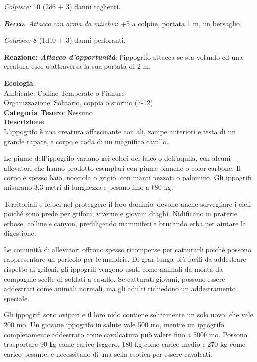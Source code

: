 \begin{multicols}{2}
{\emph{Colpisce:} 10 (2d6 + 3) danni taglienti.

\emph{\textbf{Becco.} Attacco con arma da mischia}: +5 a colpire, portata 1 m, un bersaglio.

\emph{Colpisce:} 8 (1d10 + 3) danni perforanti.

\textbf{Reazione: \emph{Attacco d'opportunità}}: l'ippogrifo attacca se sta volando ed una creatura esce o attraversa la sua portata di 2 m.

\textbf{Ecologia}\\
Ambiente: Colline Temperate o Pianure\\
Organizzazione: Solitario, coppia o stormo (7-12)\\
\textbf{Categoria Tesoro}: Nessuno\\
\textbf{Descrizione}\\
L'ippogrifo è una creatura affascinante con ali, zampe anteriori e testa di un grande rapace, e corpo e coda di un magnifico cavallo.

Le piume dell'ippogrifo variano nei colori del falco o dell'aquila, con alcuni allevatori che hanno prodotto esemplari con piume bianche o color carbone. Il corpo è spesso baio, nocciola o grigio, con manti pezzati o palomino. Gli ippogrifi misurano 3,3 metri di lunghezza e pesano fino a 680 kg.

Territoriali e feroci nel proteggere il loro dominio, devono anche sorvegliare i cieli poiché sono prede per grifoni, viverne e giovani draghi. Nidificano in praterie erbose, colline e canyon, prediligendo mammiferi e brucando erba per aiutare la digestione.

Le comunità di allevatori offrono spesso ricompense per catturarli poiché possono rappresentare un pericolo per le mandrie. Di gran lunga più facili da addestrare rispetto ai grifoni, gli ippogrifi vengono usati come animali da monta da compagnie scelte di soldati a cavallo. Se catturati giovani, possono essere addestrati come animali normali, ma gli adulti richiedono un addestramento speciale.

Gli ippogrifi sono ovipari e il loro nido contiene solitamente un solo uovo, che vale 200 mo. Un giovane ippogrifo in salute vale 500 mo, mentre un ippogrifo completamente addestrato come cavalcatura può valere fino a 5000 mo. Possono trasportare 90 kg come carico leggero, 180 kg come carico medio e 270 kg come carico pesante, e necessitano di una sella esotica per essere cavalcati.


}
\end{multicols}
